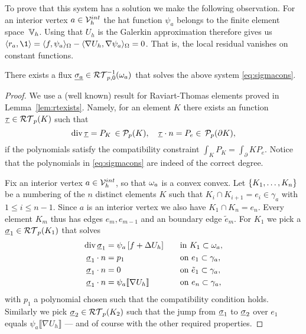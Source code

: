 \documentclass[thesis.tex]{subfiles}
\begin{document}
To prove that this system has a solution we make the following observation.
For an interior vertex $a \in \mathcal{V}_h^{int}$ the hat function $\psi_a$ belongs to the finite element space~$\mathbb{V}_h$. 
Using that $U_h$ is the Galerkin approximation therefore gives us $\ip{r_a,\1} = \ip{f, \psi_a}_\O - \ip{\nabla U_h, \nabla \psi_a}_{\O} = 0$.
That is, the local residual vanishes on constant functions.
\begin{thm}
  \label{thm:sigmasolvable}
  There exists a flux $\underline{\sigma_a} \in \mathcal{RT}_{p,0}^{-1}(\omega_a)$ that solves the above system \eqref{eq:sigmacons}.
\end{thm}
\begin{proof}
  We use a (well known) result for Raviart-Thomas elements proved in Lemma~\ref{lem:rtexists}. Namely, 
  for an element $K$ there exists an function $\underline{\tau} \in \mathcal{RT}_p(K)$ such that
  \[
    \operatorname{div} \underline{\tau} = P_K \, \in \mathcal{P}_p(K), \quad \underline{\tau} \cdot n = P_e \in \,\mathcal{P}_p(\partial K),
  \]
  if the polynomials satisfy the compatibility constraint $\int_K P_K = \int_\partial K P_e$.
  Notice that the polynomials in \eqref{eq:sigmacons} are indeed of the correct degree.

  Fix an interior vertex $a \in \mathcal{V}_h^{int}$, so that $\omega_a$ is a convex convex. Let $\set{K_1,\dots,K_n}$ be a numbering
  of the $n$ distinct elements $K$ such that $K_i \cap K_{i+1} =e_i \in \gamma_a$ with $1 \leq i \leq n-1$. Since $a$ is an
  interior vertex we also have $K_1 \cap K_n = e_n$. Every element $K_m$ thus has edges $e_m, e_{m-1}$ and an boundary edge $\tilde e_m$. For $K_1$ we pick a $\underline{\sigma}_1\in \mathcal{RT}_p(K_1)$ that solves
  \begin{alignat*}{3}
    \operatorname{div} \underline{\sigma}_1 &= \psi_a \left [f + \Delta U_h\right] && \quad\text{in }  K_1\subset \omega_a ,\\
    \underline{\sigma}_1 \cdot n  &= p_1 && \quad \text{on } e_{1} \subset \gamma_a,\\
    \underline{\sigma}_1 \cdot n  &= 0 && \quad \text{on } \tilde e_1 \subset \gamma_a,\\
    \underline{\sigma}_1 \cdot n  &= \psi_a \llbracket \nabla U_h \rrbracket && \quad \text{on } e_n \subset \gamma_a,
  \end{alignat*}
  with $p_1$ a polynomial chosen such that the compatibility condition holds. Similarly we pick $\underline{\sigma}_2 \in \mathcal{RT}_p(K_2)$
  such that the jump from $\underline{\sigma}_1$ to $\underline{\sigma}_2$ over $e_1$ equals $\psi_a \llbracket \nabla U_h \rrbracket$ --- and of course
  with the other required properties. 
  

\end{proof}
\end{document}
